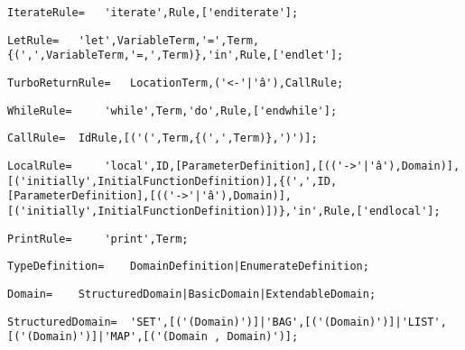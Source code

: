 \documentclass{article}
\begin{document}
    \begin{lstlisting}[mathescape=true]
     IterateRule= 	'iterate',Rule,['enditerate'];
    \end{lstlisting}
    
    \begin{lstlisting}[mathescape=true]
     LetRule= 	'let',VariableTerm,'=',Term,{(',',VariableTerm,'=,',Term)},'in',Rule,['endlet'];
    \end{lstlisting}
    
    \begin{lstlisting}[mathescape=true]
     TurboReturnRule= 	LocationTerm,('<-'|'â'),CallRule;
    \end{lstlisting}
    
    \begin{lstlisting}[mathescape=true]
     WhileRule= 	'while',Term,'do',Rule,['endwhile'];
    \end{lstlisting}
    
    \begin{lstlisting}[mathescape=true]
     CallRule= 	IdRule,[('(',Term,{(',',Term)},')')];
    \end{lstlisting}
    
    \begin{lstlisting}[mathescape=true]
     LocalRule= 	'local',ID,[ParameterDefinition],[(('->'|'â'),Domain)],[('initially',InitialFunctionDefinition)],{(',',ID,[ParameterDefinition],[(('->'|'â'),Domain)],[('initially',InitialFunctionDefinition)])},'in',Rule,['endlocal'];
    \end{lstlisting}
    
    \begin{lstlisting}[mathescape=true]
     PrintRule= 	'print',Term;
    \end{lstlisting}
    
    \begin{lstlisting}[mathescape=true]
     TypeDefinition= 	DomainDefinition|EnumerateDefinition;
    \end{lstlisting}
    
    \begin{lstlisting}[mathescape=true]
     Domain= 	StructuredDomain|BasicDomain|ExtendableDomain;
    \end{lstlisting}
    
    \begin{lstlisting}[mathescape=true]
     StructuredDomain= 	'SET',[('(Domain)')]|'BAG',[('(Domain)')]|'LIST',[('(Domain)')]|'MAP',[('(Domain , Domain)')];
    \end{lstlisting}
    
\end{document}
